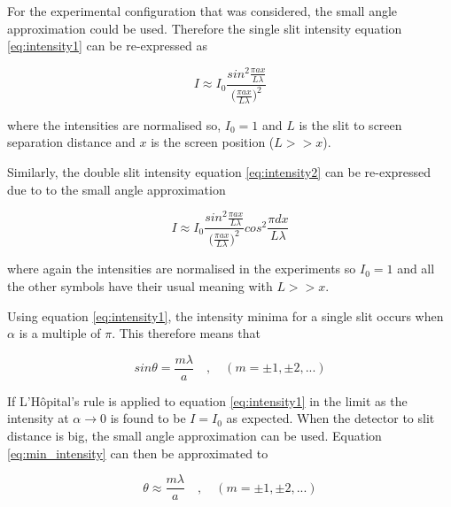 \documentclass{article}
\begin{document}
\vspace{2mm}
\noindent
For the experimental configuration that was considered, the small angle approximation could be used. Therefore the single slit intensity equation \eqref{eq:intensity1} can be re-expressed as

\begin{equation}
\label{eq:intensity_small1}
I \approx I_0 \frac{sin^2{\frac{\pi a x}{L \lambda}}}{\big(\frac{\pi a x}{L \lambda}\big)^2}
\end{equation}

\vspace{2mm}
\noindent
where the intensities are normalised so, $I_0 = 1$ and $L$ is the slit to screen separation distance and $x$ is the screen position ($L >> x$).

\vspace{2mm}
\noindent
Similarly, the double slit intensity equation \eqref{eq:intensity2} can be re-expressed due to to the small angle approximation

\begin{equation}
\label{eq:intensity_small2}
I \approx I_0 \frac{sin^2{\frac{\pi a x}{L \lambda}}}{\big(\frac{\pi a x}{L \lambda}\big)^2} cos^2{\frac{\pi d x}{L \lambda}}
\end{equation}

\vspace{2mm}
\noindent
where again the intensities are normalised in the experiments so $I_0 = 1$ and all the other symbols have their usual meaning with $L >> x$.



\vspace{2mm}
\noindent
Using equation \eqref{eq:intensity1}, the intensity minima for a single slit occurs when $\alpha$ is a multiple of $\pi$. This therefore means that

\begin{equation}
\label{eq:min_intensity}
sin{\theta} = \frac{m \lambda}{a} \quad,\quad(m = \pm1, \pm2, ...)
\end{equation}

\vspace{2mm}
\noindent
If L'H{\^o}pital's rule \cite{Book01} is applied to equation \eqref{eq:intensity1} in the limit as the intensity at $\alpha \rightarrow 0$ is found to be $I = I_0$ as expected. When the detector to slit distance is big, the small angle approximation can be used. Equation \eqref{eq:min_intensity} can then be approximated to

\begin{equation}
\label{eq:small_angle}
\theta \approx \frac{m\lambda}{a} \quad,\quad(m = \pm1, \pm2, ...)
\end{equation}
\end{document}
